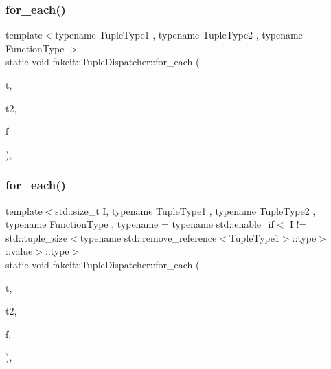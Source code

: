 \mbox{\label{structfakeit_1_1TupleDispatcher_a1ddb90f24aa73dd61bf2b95c5f176cd5}} 
\subsubsection{\texorpdfstring{for\_each()}{for\_each()}\hspace{0.1cm}{\footnotesize\ttfamily [38/54]}}
{\footnotesize\ttfamily template$<$typename Tuple\+Type1 , typename Tuple\+Type2 , typename Function\+Type $>$ \\
static void fakeit\+::\+Tuple\+Dispatcher\+::for\+\_\+each (\begin{DoxyParamCaption}\item[{Tuple\+Type1 \&\&}]{t,  }\item[{Tuple\+Type2 \&\&}]{t2,  }\item[{Function\+Type \&}]{f }\end{DoxyParamCaption})\hspace{0.3cm}{\ttfamily [inline]}, {\ttfamily [static]}}

\mbox{\label{structfakeit_1_1TupleDispatcher_a42566b7faaac776dc99492e7c0b973b3}} 
\subsubsection{\texorpdfstring{for\_each()}{for\_each()}\hspace{0.1cm}{\footnotesize\ttfamily [39/54]}}
{\footnotesize\ttfamily template$<$std\+::size\+\_\+t I, typename Tuple\+Type1 , typename Tuple\+Type2 , typename Function\+Type , typename  = typename std\+::enable\+\_\+if$<$            I != std\+::tuple\+\_\+size$<$typename std\+::remove\+\_\+reference$<$\+Tuple\+Type1$>$\+::type$>$\+::value$>$\+::type$>$ \\
static void fakeit\+::\+Tuple\+Dispatcher\+::for\+\_\+each (\begin{DoxyParamCaption}\item[{Tuple\+Type1 \&\&}]{t,  }\item[{Tuple\+Type2 \&\&}]{t2,  }\item[{Function\+Type \&}]{f,  }\item[{std\+::integral\+\_\+constant$<$ size\+\_\+t, I $>$}]{ }\end{DoxyParamCaption})\hspace{0.3cm}{\ttfamily [inline]}, {\ttfamily [static]}}

